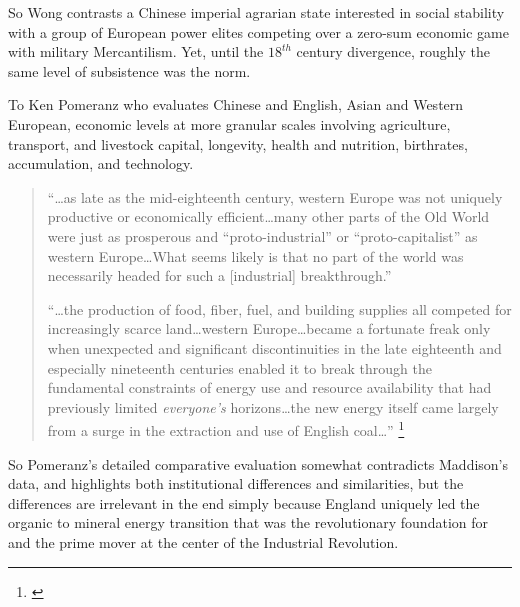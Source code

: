 \documentclass[12pt]{article}
\numberwithin{equation}{section}
\begin{document}
		So Wong contrasts a Chinese imperial agrarian state interested in social stability with a group of European power elites competing over a zero-sum economic game with military Mercantilism. Yet, until the $18^{th}$ century divergence, roughly the same level of subsistence was the norm.

		
		To Ken Pomeranz who evaluates Chinese and English, Asian and Western European, economic levels at more granular scales involving agriculture, transport, and livestock capital, longevity, health and nutrition, birthrates, accumulation, and technology.
		
		\begin{quotation}
		``\ldots as late as the mid-eighteenth century, western Europe was not uniquely productive or economically efficient\ldots many other parts of the Old World were just as prosperous and ``proto-industrial'' or ``proto-capitalist'' as western Europe\ldots What seems likely is that no part of the world was necessarily headed for such a [industrial] breakthrough.''
		
		``\ldots the production of food, fiber, fuel, and building supplies all competed for increasingly scarce land\ldots western Europe\ldots became a fortunate freak only when unexpected and significant discontinuities in the late eighteenth and especially nineteenth centuries enabled it to break through the fundamental constraints of energy use and resource availability that had previously limited \textit{everyone's} horizons\dots the new energy itself came largely from a surge in the extraction and use of English coal\ldots'' \footnote{\citet[pp.~206 -- 207]{pomeranz_great_2001}}
		\end{quotation}
		
		So Pomeranz's detailed comparative evaluation somewhat contradicts Maddison's data, and highlights both institutional differences and similarities, but the differences are irrelevant in the end simply because England uniquely led the organic to mineral energy transition that was the revolutionary foundation for and the prime mover at the center of the Industrial Revolution.
		
\end{document}
